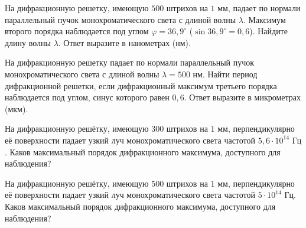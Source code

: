\begin{taskbasic}[code={\label{task:wave_opt_v9_n23}}]
На дифракционную решетку, имеющую $500\text{ штрихов}$ на $1\text{ мм}$, падает по нормали параллельный пучок монохроматического света с длиной волны $\lambda$. Максимум второго порядка наблюдается под углом $\varphi = 36{,}9^\circ$ ($\sin 36{,}9^\circ = 0{,}6$). Найдите длину волны $\lambda$. Ответ выразите в нанометрах (нм).

\end{taskbasic}

\begin{taskbasic}[code={\label{task:wave_opt_v10_n23}}]
На дифракционную решетку падает по нормали параллельный пучок монохроматического света с длиной волны $\lambda = 500\text{ нм}$. Найти период дифракционной решетки, если дифракционный максимум третьего порядка наблюдается под углом, синус которого равен $0{,}6$. Ответ выразите в микрометрах (мкм).

\end{taskbasic}

\begin{taskbasic}[code={\label{task:wave_opt_diffraction_grating_max_k_300}}]
На дифракционную решётку, имеющую $300\text{ штрихов}$ на $1\text{ мм}$, перпендикулярно её поверхности падает узкий луч монохроматического света частотой $5{,}6 \cdot 10^{14}\text{ Гц}$. Каков максимальный порядок дифракционного максимума, доступного для наблюдения?

\end{taskbasic}

\begin{taskbasic}[code={\label{task:wave_opt_diffraction_grating_max_k_500}}]
На дифракционную решётку, имеющую $500\text{ штрихов}$ на $1\text{ мм}$, перпендикулярно её поверхности падает узкий луч монохроматического света частотой $5 \cdot 10^{14}\text{ Гц}$. Каков максимальный порядок дифракционного максимума, доступного для наблюдения?

\end{taskbasic}
